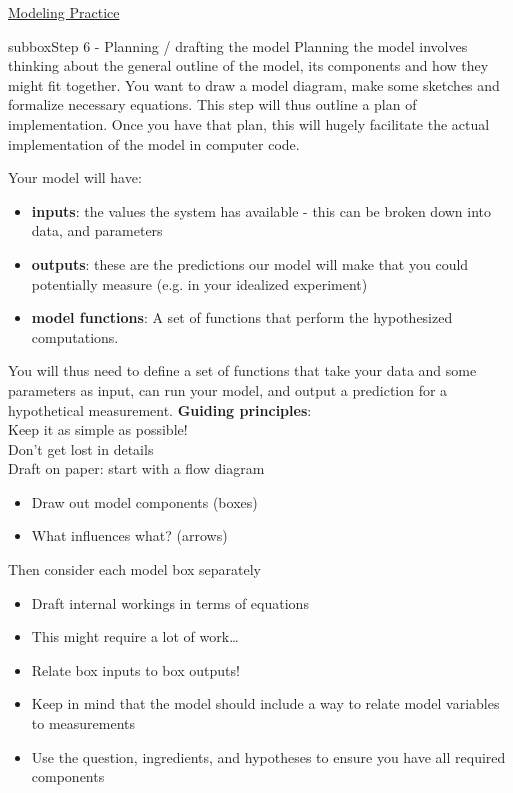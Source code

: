 \begin{textbox}{\href{https://compneuro.neuromatch.io/projects/modelingsteps/ModelingSteps_5through10.html}{Modeling Practice  } }

\begin{subbox}{subbox}{Step 6 - Planning / drafting the model}
\scriptsize
Planning the model involves thinking about the general outline of the model, its components and how they might fit together. You want to draw a model diagram, make some sketches and formalize necessary equations. This step will thus outline a plan of implementation. Once you have that plan, this will hugely facilitate the actual implementation of the model in computer code. 

Your model will have:
\begin{itemize}
 
   \item  \textbf{inputs}: the values the system has available - this can be broken down into data, and parameters 
   \item   \textbf{outputs}: these are the predictions our model will make that you could potentially measure (e.g. in your idealized experiment)
   \item   \textbf{model functions}: A set of functions that perform the hypothesized computations.
\end{itemize}

You will thus need to define a set of functions that take your data and some parameters as input, can run your model, and output a prediction for a hypothetical measurement. \textbf{Guiding principles}:\\
Keep it as simple as possible!\\
Don't get lost in details\\
Draft on paper: start with a flow diagram \\
\begin{itemize}
    \item 
   Draw out model components (boxes)
   \item What influences what? (arrows)
  \end{itemize}

Then consider each model box separately
\begin{itemize}
  \item  Draft internal workings in terms of equations
  \item  This might require a lot of work…
  \item  Relate box inputs to box outputs!
  \item  Keep in mind that the model should include a way to relate model variables to measurements
  \item  Use the question, ingredients, and hypotheses to ensure you have all required components
\end{itemize}


\end{subbox}
\end{textbox}
